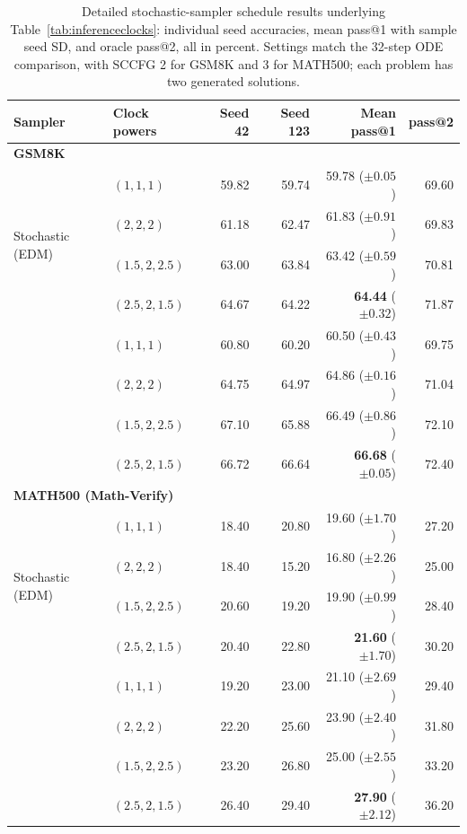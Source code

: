 \documentclass[11pt,letterpaper]{article}
\begin{document}
\begin{table}[htbp]
\centering\small
\setlength{\tabcolsep}{4pt}
\caption{Detailed stochastic-sampler schedule results underlying Table~\ref{tab:inferenceclocks}: individual seed accuracies, mean pass@1 with sample seed SD, and oracle pass@2, all in percent. Settings match the 32-step ODE comparison, with SCCFG 2 for GSM8K and 3 for MATH500; each problem has two generated solutions.}
\label{tab:stochasticclockdetail}
\begin{tabular}{@{}llrrrr@{}}
\toprule
Sampler & Clock powers & Seed 42 & Seed 123 & Mean pass@1 & pass@2 \\
\midrule
\multicolumn{6}{l}{\textbf{GSM8K}} \\
\multirow{4}{*}{Stochastic (EDM)} & $(1,1,1)$ & 59.82 & 59.74 & 59.78 {\scriptsize($\pm 0.05$)} & 69.60 \\
 & $(2,2,2)$ & 61.18 & 62.47 & 61.83 {\scriptsize($\pm 0.91$)} & 69.83 \\
 & $(1.5,2,2.5)$ & 63.00 & 63.84 & 63.42 {\scriptsize($\pm 0.59$)} & 70.81 \\
 & $(2.5,2,1.5)$ & 64.67 & 64.22 & \textbf{64.44} {\scriptsize($\pm 0.32$)} & 71.87 \\
\addlinespace[3pt]
\multirow{4}{*}{Stochastic (DMD2)} & $(1,1,1)$ & 60.80 & 60.20 & 60.50 {\scriptsize($\pm 0.43$)} & 69.75 \\
 & $(2,2,2)$ & 64.75 & 64.97 & 64.86 {\scriptsize($\pm 0.16$)} & 71.04 \\
 & $(1.5,2,2.5)$ & 67.10 & 65.88 & 66.49 {\scriptsize($\pm 0.86$)} & 72.10 \\
 & $(2.5,2,1.5)$ & 66.72 & 66.64 & \textbf{66.68} {\scriptsize($\pm 0.05$)} & 72.40 \\
\midrule
\multicolumn{6}{l}{\textbf{MATH500 (Math-Verify)}} \\
\multirow{4}{*}{Stochastic (EDM)} & $(1,1,1)$ & 18.40 & 20.80 & 19.60 {\scriptsize($\pm 1.70$)} & 27.20 \\
 & $(2,2,2)$ & 18.40 & 15.20 & 16.80 {\scriptsize($\pm 2.26$)} & 25.00 \\
 & $(1.5,2,2.5)$ & 20.60 & 19.20 & 19.90 {\scriptsize($\pm 0.99$)} & 28.40 \\
 & $(2.5,2,1.5)$ & 20.40 & 22.80 & \textbf{21.60} {\scriptsize($\pm 1.70$)} & 30.20 \\
\addlinespace[3pt]
\multirow{4}{*}{Stochastic (DMD2)} & $(1,1,1)$ & 19.20 & 23.00 & 21.10 {\scriptsize($\pm 2.69$)} & 29.40 \\
 & $(2,2,2)$ & 22.20 & 25.60 & 23.90 {\scriptsize($\pm 2.40$)} & 31.80 \\
 & $(1.5,2,2.5)$ & 23.20 & 26.80 & 25.00 {\scriptsize($\pm 2.55$)} & 33.20 \\
 & $(2.5,2,1.5)$ & 26.40 & 29.40 & \textbf{27.90} {\scriptsize($\pm 2.12$)} & 36.20 \\
\bottomrule
\end{tabular}
\end{table}
\end{document}
